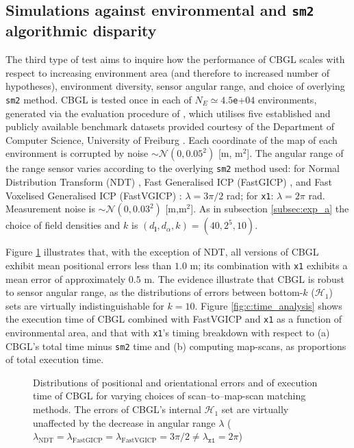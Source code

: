 \subsection{Simulations against environmental and \texttt{sm2} algorithmic disparity}
\label{subsec:exp_c}

The third type of test aims to inquire how the performance of CBGL scales with
respect to increasing environment area (and therefore to increased number of
hypotheses), environment diversity, sensor angular range, and choice of
overlying \texttt{sm2} method. CBGL is tested once in each of $N_E \simeq
4.5$\texttt{e}+$04$ environments, generated via the evaluation procedure of
\cite{Filotheou2023a}, which utilises five established and publicly available
benchmark datasets provided courtesy of the Department of Computer Science,
University of Freiburg \cite{datasets_link}. Each coordinate of the map of
each environment is corrupted by noise $\sim\mathcal{N}(0,0.05^2)$ [m, m$^2$].
The angular range of the range sensor varies according to the overlying
\texttt{sm2} method used: for Normal Distribution Transform (NDT) \cite{ndt},
Fast Generalised ICP (FastGICP) \cite{fgi}, and Fast Voxelised Generalised ICP
(FastVGICP) \cite{fvg}: $\lambda = 3\pi/2$ rad; for \texttt{x1}: $\lambda =
2\pi$ rad. Measurement noise is $\sim \mathcal{N}(0,0.03^2)$ [m,m$^2$]. As in
subsection \ref{subsec:exp_a} the choice of field densities and $k$ is
$(d_{\bm{l}},d_{\alpha},k) = (40, 2^5, 10)$.

Figure \ref{fig:c:errors_and_time} illustrates that, with the exception of NDT,
all versions of CBGL exhibit mean positional errors less than $1.0$ m; its
combination with \texttt{x1} exhibits a mean error of approximately $0.5$ m.
The evidence illustrate that CBGL is robust to sensor angular range, as the
distributions of errors between bottom-$k$ ($\mathcal{H}_1$) sets are
virtually indistinguishable for $k=10$. Figure \ref{fig:c:time_analysis} shows
the execution time of CBGL combined with FastVGICP and \texttt{x1} as a
function of environmental area, and that with \texttt{x1}'s timing breakdown
with respect to (a) CBGL's total time minus \texttt{sm2} time and (b) computing
map-scans, as proportions of total execution time.

\begin{figure}
  
  \vspace{0.1cm}
  \caption{\small Distributions of positional and orientational errors and of
           execution time of CBGL for varying choices of scan--to--map-scan
           matching methods. The errors of CBGL's internal $\mathcal{H}_1$ set
           are virtually unaffected by the decrease in angular range $\lambda$
           ($\lambda_{\text{NDT}} = \lambda_{\text{FastGICP}} =
           \lambda_{\text{FastVGICP}} = 3\pi/2 \neq \lambda_{\texttt{x1}} = 2\pi$)
           }
  \label{fig:c:errors_and_time}
\end{figure}


